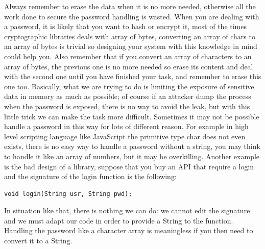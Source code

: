 Always remember to erase the data when it is no more needed, otherwise all the work done to secure the password handling is wasted.\newline
When you are dealing with a password, it is likely that you want to hash or encrypt it, most of the times cryptographic libraries deals with array of bytes, converting an array of chars to an array of bytes is trivial so designing your system with this knowledge in mind could help you.\newline
Also remember that if you convert an array of characters to an array of bytes, the previous one is no more needed so erase its content and deal with the second one until you have finished your task, and remember to erase this one too.\newline
Basically, what we are trying to do is limiting the exposure of sensitive data in memory as much as possible; of course if an attacker dump the process when the password is exposed, there is no way to avoid the leak, but with this little trick we can make the task more difficult.\newline
Sometimes it may not be possible handle a password in this way for lots of different reason.\newline
For example in high level scripting language like JavaScript the primitive type char does not even exists, there is no easy way to handle a password without a string, you may think to handle it like an array of numbers, but it may be overkilling.\newline
Another example is the bad design of a library, suppose that you buy an API that require a login and the signature of the login function is the following:
\begin{lstlisting}
void login(String usr, String pwd);
\end{lstlisting}

In situation like that, there is nothing we can do: we cannot edit the signature and we must adapt our code in order to provide a String to the function.\newline
Handling the password like a character array is meaningless if you then need to convert it to a String.\newline

